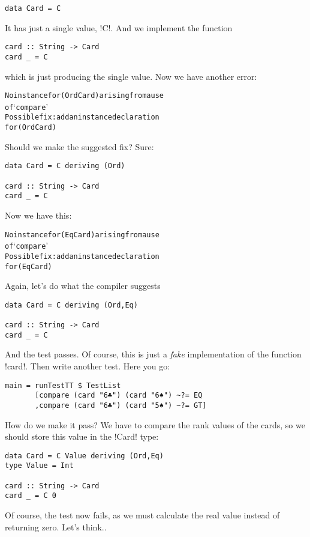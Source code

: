 \begin{lstlisting}[frame=single]
data Card = C 
\end{lstlisting}
It has just a single value, \il!C!. And we implement the function
\begin{lstlisting}[frame=single]
card :: String -> Card
card _ = C
\end{lstlisting}
which is just producing the single value.
\lhN \error Now we have another error:
\begin{small}
\begin{alltt}
No instance for (Ord Card) arising from a use 
of `compare' 
Possible fix: add an instance declaration 
for (Ord Card)
\end{alltt}
\end{small}
Should we make the suggested fix?
\lhA \error Sure:
\begin{lstlisting}[frame=single]
data Card = C deriving (Ord)

card :: String -> Card
card _ = C
\end{lstlisting}
\lhN \error Now we have this:
\begin{small}
\begin{alltt}
No instance for (Eq Card) arising from a use 
of `compare' 
Possible fix: add an instance declaration
for (Eq Card)
\end{alltt}
\end{small}
\lhA \error Again, let's do what the compiler suggests 
\begin{lstlisting}[frame=single]
data Card = C deriving (Ord,Eq)

card :: String -> Card
card _ = C
\end{lstlisting}
\success And the test passes.
\lhN Of course, this is just a \emph{fake} implementation of the function \il!card!.
\lhA Then write another test.
\lhN Here you go:
\begin{lstlisting}[frame=single]
main = runTestTT $ TestList 
       [compare (card "6♣") (card "6♠") ~?= EQ
       ,compare (card "6♣") (card "5♠") ~?= GT]
\end{lstlisting} %
How do we make it pass? 
\lhA \error We have to compare the rank values of the cards, so we should store this value in the \il!Card! type:
\begin{lstlisting}[frame=single]
data Card = C Value deriving (Ord,Eq)
type Value = Int

card :: String -> Card
card _ = C 0
\end{lstlisting}
\failure Of course, the test now fails, as we must calculate the real value instead of returning zero. Let's think..
